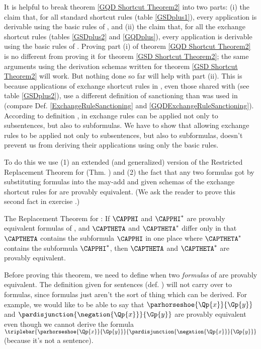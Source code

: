 It is helpful to break theorem \ref{GQD Shortcut Theorem2} into two parts: (i) the claim that, for all standard shortcut rules (table \ref{GSDplus1}), every application is derivable using the basic rules of \GQD{}, and (ii) the claim that, for all the exchange shortcut rules (tables \ref{GSDplus2} and \ref{GQDplus}), every application is derivable using the basic rules of \GQD{}. 
Proving part (i) of theorem \ref{GQD Shortcut Theorem2} is no different from proving it for theorem \ref{GSD Shortcut Theorem2}; the same arguments using the derivation schemas written for theorem \ref{GSD Shortcut Theorem2} will work.
But nothing done so far will help with part (ii).
This is because applications of exchange shortcut rules in \GQDP{}, even those shared with \GSDP{} (see table \ref{GSDplus2}), use a different definition of sanctioning than was used in \GSDP{} (compare Def. \ref{ExchangeRuleSanctioning} and \ref{GQDExchangeRuleSanctioning}). 
According to definition , in \GQDP{} exchange rules can be applied not only to subsentences, but also to subformulas. 
We have to show that allowing exchange rules to be applied not only to subsentences, but also to subformulas, doesn't prevent us from deriving their applications using only the basic rules.

To do this we use (1) an extended (and generalized) version of the Restricted Replacement Theorem for \GSD{} (Thm. ) and (2) the fact that any two formulas got by substituting \GQL{} formulas into the may-add and given schemas of the exchange shortcut rules for \GQD{} are provably equivalent. 
(We ask the reader to prove this second fact in exercise .)
\begin{THEOREM}{ The Replacement Theorem for \GQD{}:}
If $\CAPPHI$ and $\CAPPHI^*$ are provably equivalent formulas of \GQL{}, and $\CAPTHETA$ and $\CAPTHETA^*$ differ only in that $\CAPTHETA$ contains the subformula $\CAPPHI$ in one place where $\CAPTHETA^*$ contains the subformula $\CAPPHI^*$, then $\CAPTHETA$ and $\CAPTHETA^*$ are provably equivalent.
\end{THEOREM}
\noindent{}Before proving this theorem, we need to define when two \emph{formulas} of \GQL{} are provably equivalent. 
The definition given for \GSL{} sentences (def. ) will not carry over to \GQL{} formulas, since formulas just aren't the sort of thing which can be derived. 
For example, we would like to be able to say that $\parhorseshoe{\Qp{\variable{x}}}{\Gp{\variable{y}}}$ and $\pardisjunction{\negation{\Qp{\variable{x}}}}{\Gp{\variable{y}}}$ are provably equivalent even though we cannot derive the formula $\triplebar{\parhorseshoe{\Qp{\variable{x}}}{\Gp{\variable{y}}}}{\pardisjunction{\negation{\Qp{\variable{x}}}}{\Gp{\variable{y}}}}$ (because it's not a sentence). 

